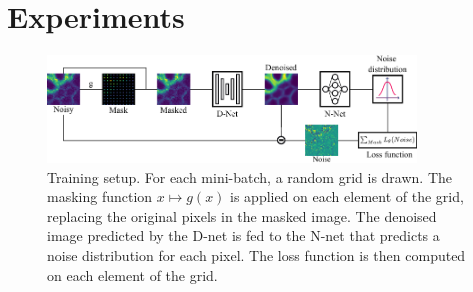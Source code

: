 \documentclass{article}
\begin{document}






\section{Experiments}
\begin{figure}
\begin{center}
\centerline{\includegraphics[width=3.85in]{fig_plomberie_1col.pdf}}
\caption{Training setup.
For each mini-batch, a random grid is drawn.
The masking function $x\mapsto g(x)$ is applied on each element of the grid, replacing the original pixels in the masked image.
The denoised image predicted by the D-net is fed to the N-net that predicts a noise distribution for each pixel.
The loss function is then computed on each element of the grid.
}
\label{fig:plumbing}
\end{center}
\vskip -0.2in
\end{figure}
\end{document}
